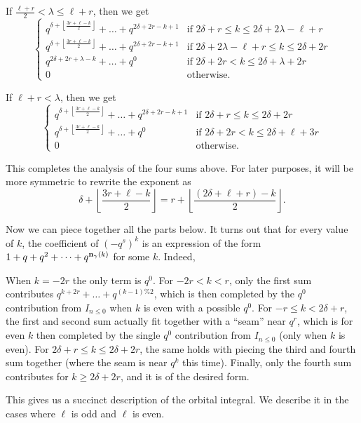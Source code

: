 \begin{itemize}
\begin{itemize}
    \ii If $\frac{\ell+r}{2} < \lambda \le \ell + r$, then we get
    \[
      \begin{cases}
        q^{\delta+\left\lfloor\frac{3r+\ell-k}{2}\right\rfloor} + \dots + q^{2\delta+2r-k+1}
          & \text{if } 2\delta+r \le k \le 2\delta+2\lambda-\ell+r  \\
        q^{\delta+\left\lfloor\frac{3r+\ell-k}{2}\right\rfloor} + \dots + q^{2\delta+2r-k+1}
          & \text{if } 2\delta+2\lambda-\ell+r \le k \le 2\delta+2r  \\
        q^{2\delta+2r+\lambda-k} + \dots + q^0
          & \text{if } 2\delta+2r < k \le 2\delta+\lambda+2r \\
        0 & \text{otherwise}.
      \end{cases}
    \]

    \ii If $\ell+r < \lambda$, then we get
    \[
      \begin{cases}
        q^{\delta+\left\lfloor\frac{3r+\ell-k}{2}\right\rfloor} + \dots + q^{2\delta+2r-k+1}
          & \text{if } 2\delta+r \le k \le 2\delta+2r \\
        q^{\delta+\left\lfloor\frac{3r+\ell-k}{2}\right\rfloor} + \dots + q^{0}
          & \text{if } 2\delta+2r < k \le 2\delta+\ell+3r \\
        0 & \text{otherwise}.
      \end{cases}
    \]
  \end{itemize}
\end{itemize}
This completes the analysis of the four sums above.
For later purposes, it will be more symmetric to rewrite the exponent as
\[ \delta + \left\lfloor \frac{3r+\ell-k}{2} \right\rfloor
  = r + \left\lfloor \frac{(2\delta+\ell+r)-k}{2} \right\rfloor. \]

Now we can piece together all the parts below.
It turns out that for every value of $k$,
the coefficient of $(-q^s)^k$ is an expression
of the form $1 + q + q^2 + \dots + q^{\mathbf n_\gamma(k)}$ for some $k$.
Indeed,
\begin{itemize}
  \ii When $k = -2r$ the only term is $q^0$.
  \ii For $-2r < k < r$, only the first sum contributes
  $q^{k+2r} + \dots + q^{(k-1)\%2}$,
  which is then completed by the $q^0$ contribution from $I_{n \le 0}$ when $k$ is even
  with a possible $q^0$.
  \ii For $-r \le k < 2\delta+r$,
  the first and second sum actually fit together with a ``seam'' near $q^r$,
  which is for even $k$ then completed by
  the single $q^0$ contribution from $I_{n \le 0}$ (only when $k$ is even).
  \ii For $2\delta+r \le k \le 2\delta+2r$,
  the same holds with piecing the third and fourth sum together
  (where the seam is near $q^k$ this time).
  \ii Finally, only the fourth sum contributes for $k \ge 2\delta+2r$,
  and it is of the desired form.
\end{itemize}
This gives us a succinct description of the orbital integral.
We describe it in the cases where $\ell$ is odd and $\ell$ is even.

